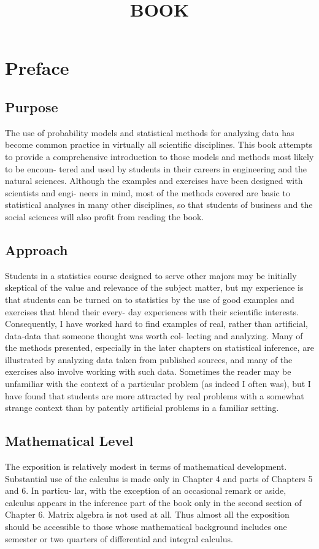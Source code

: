 \documentclass{book}
\title{BOOK}
\begin{document}
\maketitle
\chapter*{Preface}
\section*{Purpose}
The use of probability models and statistical methods for analyzing data has become common practice in virtually all scientific disciplines. This book attempts to provide a comprehensive introduction to those models and methods most likely to be encoun- tered and used by students in their careers in engineering and the natural sciences. Although the examples and exercises have been designed with scientists and engi- neers in mind, most of the methods covered are basic to statistical analyses in many other disciplines, so that students of business and the social sciences will also profit from reading the book.
\section*{Approach}
Students in a statistics course designed to serve other majors may be initially skeptical of the value and relevance of the subject matter, but my experience is that students can be turned on to statistics by the use of good examples and exercises that blend their every- day experiences with their scientific interests. Consequently, I have worked hard to find examples of real, rather than artificial, data-data that someone thought was worth col- lecting and analyzing. Many of the methods presented, especially in the later chapters on statistical inference, are illustrated by analyzing data taken from published sources, and many of the exercises also involve working with such data. Sometimes the reader may be unfamiliar with the context of a particular problem (as indeed I often was), but I have found that students are more attracted by real problems with a somewhat strange context than by patently artificial problems in a familiar setting.
\section*{Mathematical Level}
The exposition is relatively modest in terms of mathematical development. Substantial use of the calculus is made only in Chapter 4 and parts of Chapters 5 and 6. In particu- lar, with the exception of an occasional remark or aside, calculus appears in the inference part of the book only in the second section of Chapter 6. Matrix algebra is not used at all. Thus almost all the exposition should be accessible to those whose mathematical background includes one semester or two quarters of differential and integral calculus. 
\end{document}
